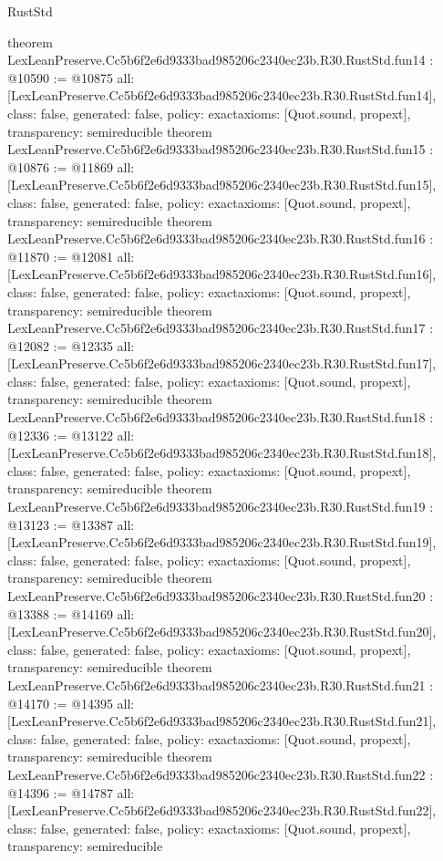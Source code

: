 \begin{lexlean}{RustStd}
\begin{coremodule}
{}
theorem LexLeanPreserve.Cc5b6f2e6d9333bad985206c2340ec23b.R30.RustStd.fun14 : @10590 := @10875 {
  all: [LexLeanPreserve.Cc5b6f2e6d9333bad985206c2340ec23b.R30.RustStd.fun14],
  class: false,
  generated: false,
  policy: exact{axioms: [Quot.sound, propext]},
  transparency: semireducible
}
theorem LexLeanPreserve.Cc5b6f2e6d9333bad985206c2340ec23b.R30.RustStd.fun15 : @10876 := @11869 {
  all: [LexLeanPreserve.Cc5b6f2e6d9333bad985206c2340ec23b.R30.RustStd.fun15],
  class: false,
  generated: false,
  policy: exact{axioms: [Quot.sound, propext]},
  transparency: semireducible
}
theorem LexLeanPreserve.Cc5b6f2e6d9333bad985206c2340ec23b.R30.RustStd.fun16 : @11870 := @12081 {
  all: [LexLeanPreserve.Cc5b6f2e6d9333bad985206c2340ec23b.R30.RustStd.fun16],
  class: false,
  generated: false,
  policy: exact{axioms: [Quot.sound, propext]},
  transparency: semireducible
}
theorem LexLeanPreserve.Cc5b6f2e6d9333bad985206c2340ec23b.R30.RustStd.fun17 : @12082 := @12335 {
  all: [LexLeanPreserve.Cc5b6f2e6d9333bad985206c2340ec23b.R30.RustStd.fun17],
  class: false,
  generated: false,
  policy: exact{axioms: [Quot.sound, propext]},
  transparency: semireducible
}
theorem LexLeanPreserve.Cc5b6f2e6d9333bad985206c2340ec23b.R30.RustStd.fun18 : @12336 := @13122 {
  all: [LexLeanPreserve.Cc5b6f2e6d9333bad985206c2340ec23b.R30.RustStd.fun18],
  class: false,
  generated: false,
  policy: exact{axioms: [Quot.sound, propext]},
  transparency: semireducible
}
theorem LexLeanPreserve.Cc5b6f2e6d9333bad985206c2340ec23b.R30.RustStd.fun19 : @13123 := @13387 {
  all: [LexLeanPreserve.Cc5b6f2e6d9333bad985206c2340ec23b.R30.RustStd.fun19],
  class: false,
  generated: false,
  policy: exact{axioms: [Quot.sound, propext]},
  transparency: semireducible
}
theorem LexLeanPreserve.Cc5b6f2e6d9333bad985206c2340ec23b.R30.RustStd.fun20 : @13388 := @14169 {
  all: [LexLeanPreserve.Cc5b6f2e6d9333bad985206c2340ec23b.R30.RustStd.fun20],
  class: false,
  generated: false,
  policy: exact{axioms: [Quot.sound, propext]},
  transparency: semireducible
}
theorem LexLeanPreserve.Cc5b6f2e6d9333bad985206c2340ec23b.R30.RustStd.fun21 : @14170 := @14395 {
  all: [LexLeanPreserve.Cc5b6f2e6d9333bad985206c2340ec23b.R30.RustStd.fun21],
  class: false,
  generated: false,
  policy: exact{axioms: [Quot.sound, propext]},
  transparency: semireducible
}
theorem LexLeanPreserve.Cc5b6f2e6d9333bad985206c2340ec23b.R30.RustStd.fun22 : @14396 := @14787 {
  all: [LexLeanPreserve.Cc5b6f2e6d9333bad985206c2340ec23b.R30.RustStd.fun22],
  class: false,
  generated: false,
  policy: exact{axioms: [Quot.sound, propext]},
  transparency: semireducible
}
\end{coremodule}
\end{lexlean}
